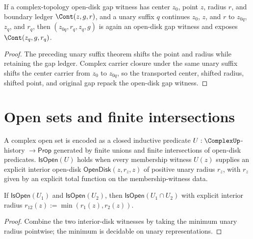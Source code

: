 \begin{theorem}
\label{thm:cplx-topo-open-disk-gap-center-point-unary-suffix-transport}
If a complex-topology open-disk gap witness has center \(z_0\), point \(z\),
radius \(r\), and boundary ledger \(\Cont(z,g,r)\), and a unary suffix \(q\)
continues \(z_0\), \(z\), and \(r\) to \(z_{0q}\), \(z_q\), and \(r_q\), then
\((z_{0q},r_q,z_q,g)\) is again an open-disk gap witness and exposes
\(\Cont(z_q,g,r_q)\).
\end{theorem}
\begin{proof}
The preceding unary suffix theorem shifts the point and radius while retaining
the gap ledger. Complex carrier closure under the same unary suffix shifts the
center carrier from \(z_0\) to \(z_{0q}\), so the transported center, shifted
radius, shifted point, and original gap repack the open-disk gap witness.
\end{proof}

\section{Open sets and finite intersections}
\label{sec:cplx-topo-open-sets}

\begin{definition}
\label{def:cplx-topo-open-set}
A complex open set is encoded as a closed inductive predicate \(U : \ComplexUp\)-history \(\to \mathsf{Prop}\) generated by finite unions and finite intersections of open-disk predicates. \(\mathsf{IsOpen}(U)\) holds when every membership witness \(U(z)\) supplies an explicit interior open-disk \(\mathsf{OpenDisk}(z, r_z, z)\) of positive unary radius \(r_z\), with \(r_z\) given by an explicit total function on the membership-witness data.
\end{definition}

\begin{theorem}
\label{thm:cplx-topo-finite-intersection}
If \(\mathsf{IsOpen}(U_1)\) and \(\mathsf{IsOpen}(U_2)\), then \(\mathsf{IsOpen}(U_1 \cap U_2)\) with explicit interior radius \(r_{12}(z) := \min(r_1(z), r_2(z))\).
\end{theorem}
\begin{proof}
Combine the two interior-disk witnesses by taking the minimum unary radius pointwise; the minimum is decidable on unary representations.
\end{proof}

